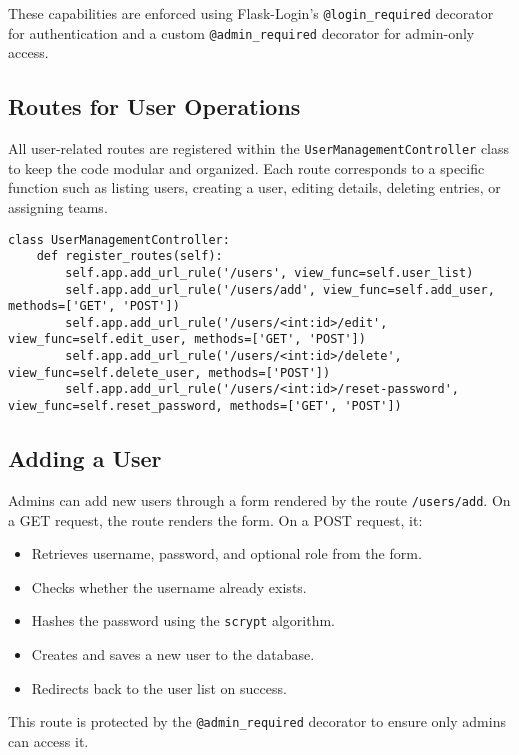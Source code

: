 \documentclass[12pt]{article}
\begin{document}
\noindent These capabilities are enforced using Flask-Login's \texttt{@login\_required} decorator for authentication and a custom \texttt{@admin\_required} decorator for admin-only access.

\subsection*{Routes for User Operations}

All user-related routes are registered within the \texttt{UserManagementController} class to keep the code modular and organized. Each route corresponds to a specific function such as listing users, creating a user, editing details, deleting entries, or assigning teams.

\begin{verbatim}
class UserManagementController:
    def register_routes(self):
        self.app.add_url_rule('/users', view_func=self.user_list)
        self.app.add_url_rule('/users/add', view_func=self.add_user, methods=['GET', 'POST'])
        self.app.add_url_rule('/users/<int:id>/edit', view_func=self.edit_user, methods=['GET', 'POST'])
        self.app.add_url_rule('/users/<int:id>/delete', view_func=self.delete_user, methods=['POST'])
        self.app.add_url_rule('/users/<int:id>/reset-password', view_func=self.reset_password, methods=['GET', 'POST'])
\end{verbatim}

\subsection*{Adding a User}

Admins can add new users through a form rendered by the route \texttt{/users/add}. On a GET request, the route renders the form. On a POST request, it:
\begin{itemize}
  \item Retrieves username, password, and optional role from the form.
  \item Checks whether the username already exists.
  \item Hashes the password using the \texttt{scrypt} algorithm.
  \item Creates and saves a new user to the database.
  \item Redirects back to the user list on success.
\end{itemize}

\noindent This route is protected by the \texttt{@admin\_required} decorator to ensure only admins can access it.
\end{document}

